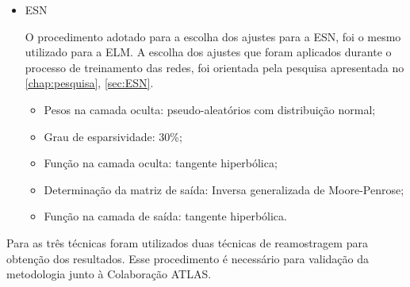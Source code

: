 \begin{itemize}
	\item ESN
	
	O procedimento adotado para a escolha dos ajustes para a ESN, foi o mesmo utilizado para a ELM. A escolha dos ajustes que foram aplicados durante o processo de treinamento das redes, foi orientada pela pesquisa apresentada no \autoref{chap:pesquisa}, \autoref{sec:ESN}.
	\begin{itemize}
		\item Pesos na camada oculta: pseudo-aleatórios com distribuição normal;
		\item Grau de esparsividade: 30\%;
		\item Função na camada oculta: tangente hiperbólica;
		\item Determinação da matriz de saída: Inversa generalizada de Moore-Penrose;
		\item Função na camada de saída: tangente hiperbólica.
	\end{itemize}
\end{itemize}

Para as três técnicas foram utilizados duas técnicas de reamostragem para obtenção dos resultados. Esse procedimento é necessário para validação da metodologia junto à Colaboração ATLAS.

